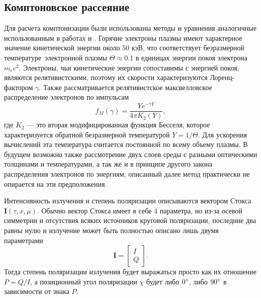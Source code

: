 \documentclass[14pt,a4paper]{extarticle}
\newcommand{\be}{\begin{equation}}
\newcommand{\ee}{\end{equation}}
\begin{document}
		\subsection{Комптоновское рассеяние}\label{sub:CS}
			Для расчета комптонизации были использованы методы и уравнения аналогичные использованным в работах \cite{Poutanen1993} и \cite{Poutanen1996}.
			Горячие электроны плазмы имеют характерное значение кинетической энергии около 50 кэВ, что соответствует безразмерной температуре электронной плазмы $\Theta\approx 0.1$ в единицах энергии покоя электрона $m_ec^2$. 
			Электроны, чьи кинетические энергии сопоставимы с энергией покоя, являются релятивистскими, поэтому их скорости характеризуются Лоренц-фактором $\gamma$. Также рассматривается релятивистское максвелловское распределение электронов по импульсам
			\be 
				\label{eq:Maxwell}
				f_M(\gamma)= \frac{Y e^{-\gamma Y}}{4\pi K_2(Y)},
			\ee
			где $K_2$ --- это вторая модифицированная функция Бесселя, которое характеризуется обратной  безразмерной температурой $Y = 1/ \Theta$. 
			Для ускорения вычислений эта температура считается постоянной по всему объему плазмы. В будущем возможно также рассмотрение двух слоев среды с разными оптическими толщинами и температурами, а так же и в принципе другого закона распределения электронов по энергиям; описанный далее метод практически не опирается на эти предположения. 

			Интенсивность излучения и степень поляризации описываются вектором Стокса $\bm{I}(\tau,x,\mu)$.
			Обычно вектор Стокса имеет в себе 4 параметра, но из-за осевой симметрии и отсутствия всяких источников круговой поляризации, последние два равны нулю и излучение может быть полностью описано лишь двумя параметрами \cite{Chandrasekhar1960}
			\be\bm I =\begin{bmatrix}I\\Q\end{bmatrix}.\ee
			Тогда степень поляризации излучения будет выражаться просто как их отношение $P=Q/I$, а позиционный угол поляризации $\chi$ будет либо $0\degree$, либо $90\degree$ в зависимости от знака $P$. 
\end{document}
